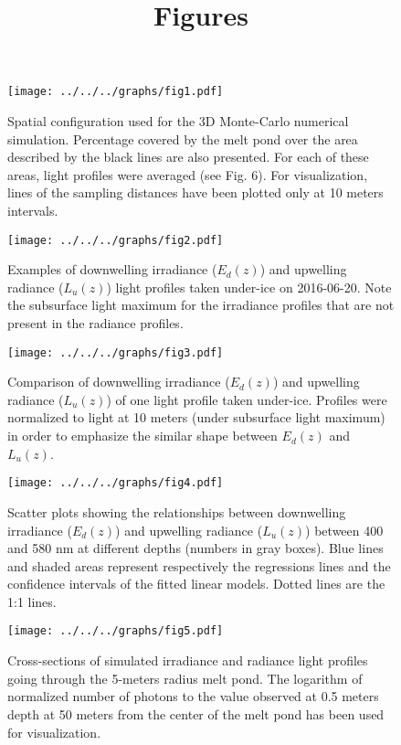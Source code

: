\documentclass[12pt,a4paper]{scrartcl}
\title{Figures}
\date{}
\newcommand{\edz}{\ensuremath{{E_d(z)}}}
\newcommand{\luz}{\ensuremath{{L_u(z)}}}
\begin{document}
\maketitle

\begin{figure}[ht]
	\centering
	\texttt{[image: ../../../graphs/fig1.pdf]}
	\caption{Spatial configuration used for the 3D Monte-Carlo numerical simulation. Percentage covered by the melt pond over the area described by the black lines are also presented. For each of these areas, light profiles were averaged (see Fig. 6). For visualization, lines of the sampling distances have been plotted only at 10 meters intervals.}
\end{figure}

\clearpage
\newpage

\begin{figure}[ht]
	\centering
	\texttt{[image: ../../../graphs/fig2.pdf]}
	\caption{Examples of downwelling irradiance (\edz{}) and upwelling radiance (\luz{}) light profiles taken under-ice on 2016-06-20. Note the subsurface light maximum for the irradiance profiles that are not present in the radiance profiles.}
\end{figure}

\clearpage
\newpage

\begin{figure}[ht]
	\centering
	\texttt{[image: ../../../graphs/fig3.pdf]}
	\caption{Comparison of downwelling irradiance (\edz{}) and upwelling radiance (\luz{}) of one light profile taken under-ice. Profiles were normalized to light at 10 meters (under subsurface light maximum) in order to emphasize the similar shape between \edz{} and \luz{}.}
\end{figure}

\clearpage
\newpage

\begin{figure}[ht]
	\centering
	\texttt{[image: ../../../graphs/fig4.pdf]}
	\caption{Scatter plots showing the relationships between downwelling irradiance (\edz{}) and upwelling radiance (\luz{}) between 400 and 580 nm at different depths (numbers in gray boxes). Blue lines and shaded areas represent respectively the regressions lines and the confidence intervals of the fitted linear models. Dotted lines are the 1:1 lines.}
\end{figure}

\clearpage
\newpage

\begin{figure}[ht]
	\centering
	\texttt{[image: ../../../graphs/fig5.pdf]}
	\caption{Cross-sections of simulated irradiance and radiance light profiles going through the 5-meters radius melt pond. The logarithm of normalized number of photons to the value observed at 0.5 meters depth at 50 meters from the center of the melt pond has been used for visualization.}
\end{figure}
\end{document}
